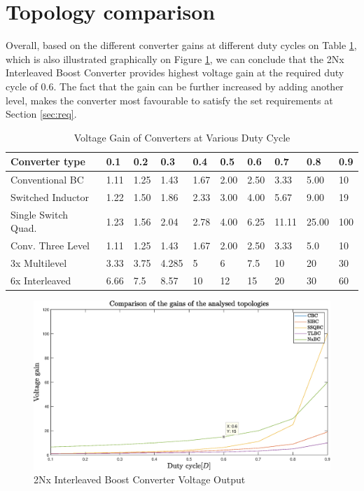 \section{Topology comparison}\label{ch:COMP}

Overall, based on the different converter gains at different duty cycles on Table \ref{tab:2NX_Overall}, which is also illustrated graphically on Figure \ref{fig:2Nx_Overall_Graph}, we can conclude that the 2Nx Interleaved Boost Converter provides highest voltage gain at the required duty cycle of 0.6. The fact that the gain can be further increased by adding another level, makes the converter most favourable to satisfy the set requirements at Section \ref{sec:req}. 

\begin{table}[H]
\begin{center}
\caption {Voltage Gain of Converters at Various Duty Cycle} \label{tab:2NX_Overall} 
\begin{tabular}{|l|l|l|l|l|l|l|l|l|l|}
\hline
\textbf{Converter type} & \textbf{0.1} & \textbf{0.2} & \textbf{0.3} & \textbf{0.4} & \textbf{0.5} & \textbf{0.6} & \textbf{0.7} & \textbf{0.8} & \textbf{0.9} \\ \hline
Conventional BC        &      1.11   &      1.25   &   1.43   &      1.67   &      2.00    &      2.50  &      3.33   &     5.00  &   10 \\ \hline
Switched Inductor   & 1.22      &      1.50   &      1.86   &      2.33   &     3.00    &     4.00    &      5.67     &    9.00   &      19\\ \hline
Single Switch Quad.        &       1.23     &      1.56      &      2.04   &      2.78   &      4.00   &      6.25   &      11.11   &      25.00   &      100 \\ \hline
Conv. Three Level          & 1.11   &      1.25   &   1.43   &      1.67   &      2.00    &      2.50  &      3.33   &     5.0  &   10\\ \hline
3x Multilevel         &     3.33       &      3.75   &     4.285   &      5   &      6   &      7.5   &      10   &      20   &      30   \\ \hline
6x Interleaved         &     6.66       &      7.5   &      8.57   &      10   &      12   &      15   &      20   &      30   &      60   \\ \hline
\end{tabular}
\end{center}
\end{table}

\begin{figure}[H]
   \centering
   \includegraphics[width=\textwidth]{figures/gains.eps}
    \caption{2Nx Interleaved Boost Converter Voltage Output}
	\label{fig:2Nx_Overall_Graph}
\end{figure}